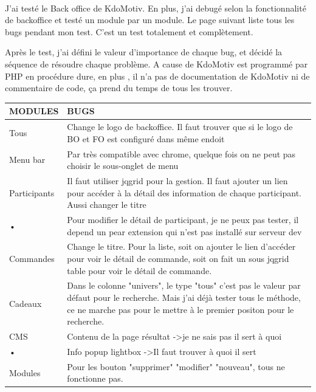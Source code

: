 \paragraph{}
J'ai testé le Back office de KdoMotiv. En plus, j'ai debugé selon la fonctionnalité de backoffice et testé un module par un module. Le page suivant liste tous les bugs pendant mon test. C'est un test totalement et complètement. 

Après le test, j'ai défini le valeur d'importance de chaque bug, et décidé la séquence de résoudre chaque problème. A cause de KdoMotiv est programmé par PHP en procédure dure, en plus , il n'a pas de documentation de KdoMotiv ni de commentaire de code, ça prend du temps de tous les trouver.

\begin{table}[htbp]
\renewcommand{\tabularxcolumn}[1]{>{\arraybackslash}m{#1}}
\begin{tabularx}{\textwidth}{lX}
\hline 
MODULES & BUGS \\ 
\hline 
Tous
 & Change le logo de backoffice. Il faut trouver que si le logo de BO et FO est configuré dans même endoit
 \\ 
\hline 
Menu bar
 & Par très compatible avec chrome, quelque fois on ne peut pas choisir le sous-onglet de menu
 \\ 
\hline 
Participants
 & Il faut utiliser jqgrid pour la gestion. Il faut ajouter un lien pour accéder à la détail des information de chaque participant. Aussi changer le titre
 \\ 
\hline 
• & Pour modifier le détail de participant, je ne peux pas tester, il depend un pear extension qui n'est pas installé sur serveur dev
 \\ 
\hline 
Commandes
 & Change le titre. Pour la liste, soit on ajouter le lien d'accéder pour voir le détail de commande, soit on fait un sous jqgrid table pour voir le détail de commande.
 \\ 
\hline 
Cadeaux
 & Dans le colonne  "univers", le type "tous" c'est pas le valeur par défaut pour le recherche. Mais j'ai déjà tester tous le méthode, ce ne marche pas pour le mettre à le premier positon pour le recherche.
 \\ 
\hline 
CMS
 & Contenu de la page résultat -\textgreater je ne sais pas il sert à quoi
 \\ 
\hline 
• & Info popup lightbox -\textgreater Il faut trouver à quoi il  sert 
 \\ 
\hline 
Modules
 & Pour les bouton "supprimer" "modifier" "nouveau", tous ne fonctionne pas.

\end{tabularx}
\end{table}
